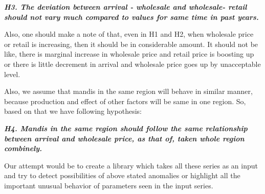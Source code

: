 \textbf{\textit{H3. The deviation between arrival - wholesale and wholesale- retail should not vary much compared to values for same time in past years.}}

Also, one should make a note of that, even in H1 and H2, when wholesale price or retail is increasing, then it should be in considerable amount. It should not be like, there is marginal increase in wholesale price and retail price is boosting up or there is little decrement in arrival and wholesale price goes up by unacceptable level.

Also, we assume that mandis in the same region will behave in similar manner, because production and effect of other factors will be same in one region. So, based on that we have following hypothesis:

\textbf{\textit{H4. Mandis in the same region should follow the same relationship between arrival and wholesale price, as that of, taken whole region combinely.}}

Our attempt would be to create a library which takes all these series as an input and try to detect possibilities of above stated anomalies or highlight all the important unusual behavior of parameters seen in the input series.


